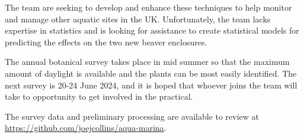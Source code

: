 \documentclass{roles}
\begin{document}
The team are seeking to develop and enhance these techniques
to help monitor and manage other aquatic sites in the UK.
Unfortunately, the team lacks expertise in statistics
and is looking for assistance to create statistical models for predicting the effects
on the two new beaver enclosures.

The annual botanical survey takes place in mid summer
so that the maximum amount of daylight is available
and the plants can be most easily identified.
The next survey is 20-24 June 2024,
and it is hoped that whoever joins the team
will take to opportunity to get involved in the practical.

The survey data and preliminary processing are available
to review at \href{https://github.com/joejcollins/aqua-marina}{https://github.com/joejcollins/aqua-marina}.
\end{document}
